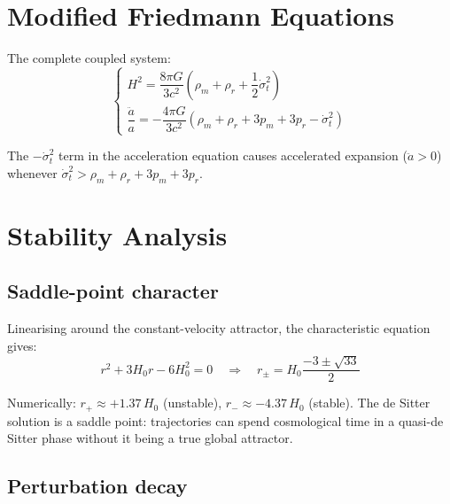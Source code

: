 \documentclass[11pt,a4paper]{article}
\theoremstyle{plain}
\theoremstyle{definition}
\theoremstyle{remark}
\begin{document}
\section{Modified Friedmann Equations}
\label{sec:friedmann}

The complete coupled system:
\begin{equation}
  \boxed{\begin{cases}
    H^2 = \dfrac{8\pi G}{3c^2}\!\left(\rho_m + \rho_r + \dfrac{1}{2}\dot\sigma_t^2\right) \\[10pt]
    \dfrac{\ddot a}{a} = -\dfrac{4\pi G}{3c^2}\!\left(\rho_m + \rho_r + 3p_m + 3p_r - \dot\sigma_t^2\right)
  \end{cases}}
  \label{eq:friedmann}
\end{equation}

The $-\dot\sigma_t^2$ term in the acceleration equation causes accelerated expansion ($\ddot a > 0$) whenever $\dot\sigma_t^2 > \rho_m + \rho_r + 3p_m + 3p_r$.

\section{Stability Analysis}
\label{sec:stability}

\subsection{Saddle-point character}

Linearising around the constant-velocity attractor, the characteristic equation gives:
\begin{equation}
  r^2 + 3H_0 r - 6H_0^2 = 0 \quad\Longrightarrow\quad r_\pm = H_0\frac{-3 \pm \sqrt{33}}{2}
\end{equation}

Numerically: $r_+ \approx +1.37\,H_0$ (unstable), $r_- \approx -4.37\,H_0$ (stable).  The de Sitter solution is a saddle point: trajectories can spend cosmological time in a quasi-de Sitter phase without it being a true global attractor.

\subsection{Perturbation decay}
\end{document}
